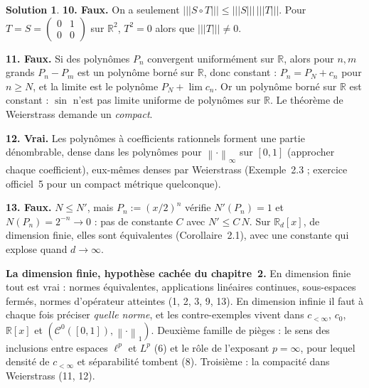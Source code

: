 \documentclass[11pt,a4paper]{article}
\newcommand{\R}{\mathbb{R}}
\newcommand{\norm}[1]{\left\|#1\right\|}
\newcommand{\opnorm}[1]{|\!|\!|#1|\!|\!|}
\newcommand{\Cz}{\mathcal{C}^0}
\theoremstyle{definition}
\newtheorem*{solution}{Solution}
\begin{document}
\begin{solution}
\medskip
\noindent\textbf{10. Faux.} On a seulement $\opnorm{S\circ T}\le\opnorm S\,\opnorm T$. Pour $T=S=\begin{pmatrix}0&1\\0&0\end{pmatrix}$ sur $\R^2$, $T^2=0$ alors que $\opnorm T\ne0$.

\medskip
\noindent\textbf{11. Faux.} Si des polynômes $P_n$ convergent uniformément sur $\R$, alors pour $n,m$ grands $P_n-P_m$ est un polynôme borné sur $\R$, donc constant : $P_n=P_N+c_n$ pour $n\ge N$, et la limite est le polynôme $P_N+\lim c_n$. Or un polynôme borné sur $\R$ est constant : $\sin$ n'est pas limite uniforme de polynômes sur $\R$. Le théorème de Weierstrass demande un \emph{compact}.

\medskip
\noindent\textbf{12. Vrai.} Les polynômes à coefficients rationnels forment une partie dénombrable, dense dans les polynômes pour $\norm\cdot_\infty$ sur $[0,1]$ (approcher chaque coefficient), eux-mêmes denses par Weierstrass (Exemple~2.3 ; exercice officiel~5 pour un compact métrique quelconque).

\medskip
\noindent\textbf{13. Faux.} $N\le N'$, mais $P_n:=(x/2)^n$ vérifie $N'(P_n)=1$ et $N(P_n)=2^{-n}\to0$ : pas de constante $C$ avec $N'\le C\,N$. Sur $\R_d[x]$, de dimension finie, elles sont équivalentes (Corollaire~2.1), avec une constante qui explose quand $d\to\infty$.
\end{solution}

\begin{piege}
\textbf{La dimension finie, hypothèse cachée du chapitre~2.} En dimension finie tout est vrai : normes équivalentes, applications linéaires continues, sous-espaces fermés, normes d'opérateur atteintes (1, 2, 3, 9, 13). En dimension infinie il faut à chaque fois préciser \emph{quelle norme}, et les contre-exemples vivent dans $c_{<\infty}$, $c_0$, $\R[x]$ et $(\Cz([0,1]),\norm\cdot_1)$. Deuxième famille de pièges : le sens des inclusions entre espaces $\ell^p$ et $L^p$ (6) et le rôle de l'exposant $p=\infty$, pour lequel densité de $c_{<\infty}$ et séparabilité tombent (8). Troisième : la compacité dans Weierstrass (11, 12).
\end{piege}
\end{document}
